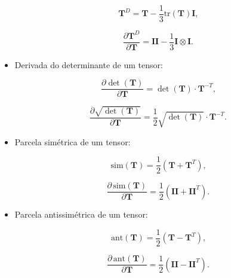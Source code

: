 \documentclass[_ArquivoPrincipal.tex]{subfiles}
\begin{document}
\begin{itemize}[leftmargin=\parindent,labelwidth=\parindent,labelsep=0.3cm]
	      \begin{equation}
		      \mathbf{T}^D = \mathbf{T} -
		      \dfrac{1}{3}\text{tr}(\mathbf{T})\mathbf{I}
		      \text{,} \label{eq:dev}
	      \end{equation}

	      \begin{equation}
		      \dfrac{\partial \mathbf{T}^D}{\partial \mathbf{T}} =
		      \mathbf{II} -
		      \dfrac{1}{3} \mathbf{I}\otimes\mathbf{I} \text{.}
		      \label{eq:ddev}
	      \end{equation}

	\item Derivada do determinante de um tensor:

	      \begin{equation}
		      \dfrac{\partial \det(\mathbf{T})}{\partial \mathbf{T}} =
		      \det(\mathbf{T})\cdot\mathbf{T}^{-T} \text{,}
		      \label{eq:ddet}
	      \end{equation}

	      \begin{equation}
		      \dfrac{\partial \sqrt{\det(\mathbf{T})}}{\partial
			      \mathbf{T}} =
		      \dfrac{1}{2}\sqrt{\det(\mathbf{T})}\cdot\mathbf{T}^{-T}
		      \text{.}
		      \label{eq:dsqrtdet}
	      \end{equation}

	\item Parcela simétrica de um tensor:

	      \begin{equation}
		      \text{sim}(\mathbf{T}) = \dfrac{1}{2}(\mathbf{T} +
		      \mathbf{T}^T)
		      \text{,} \label{eq:sim}
	      \end{equation}

	      \begin{equation}
		      \dfrac{\partial\, \text{sim}(\mathbf{T})}{\partial
			      \mathbf{T}} =
		      \dfrac{1}{2}(\mathbf{II} + \mathbf{II}^T)
		      \text{.}\label{eq:dsim}
	      \end{equation}

	\item Parcela antissimétrica de um tensor:

	      \begin{equation}
		      \text{ant}(\mathbf{T}) = \dfrac{1}{2}(\mathbf{T} -
		      \mathbf{T}^T)
		      \text{,} \label{eq:ant}
	      \end{equation}

	      \begin{equation}
		      \dfrac{\partial\, \text{ant}(\mathbf{T})}{\partial
			      \mathbf{T}} =
		      \dfrac{1}{2}(\mathbf{II} - \mathbf{II}^T)
		      \text{.}\label{eq:dant}
	      \end{equation}


\end{itemize}
\end{document}
